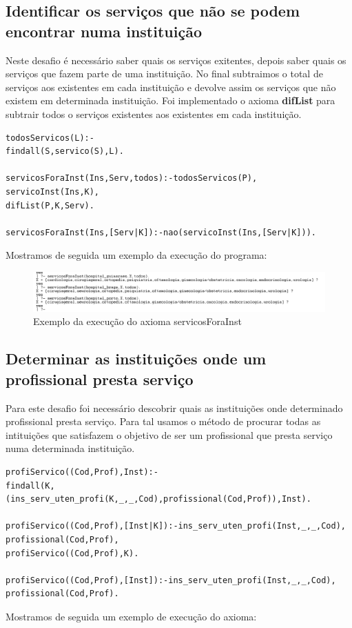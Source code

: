 \subsection{Identificar os serviços que não se podem encontrar numa instituição}
Neste desafio é necessário saber quais os serviços exitentes, depois saber quais os serviços que fazem parte de uma instituição. No final subtraimos o total de serviços aos existentes em cada instituição e devolve assim os serviços que não existem em determinada instituição. Foi implementado o axioma \textbf{difList} para subtrair todos o serviços existentes aos existentes em cada instituição. 

\begin{verbatim}
todosServicos(L):-
findall(S,servico(S),L).

servicosForaInst(Ins,Serv,todos):-todosServicos(P), 
servicoInst(Ins,K),
difList(P,K,Serv).

servicosForaInst(Ins,[Serv|K]):-nao(servicoInst(Ins,[Serv|K])).
\end{verbatim}

Mostramos de seguida um exemplo da execução do programa: 

\begin{figure}[<+htpb+>]
	\centering
	\includegraphics[scale=0.6]{answer6.png}
	\caption{Exemplo da execução do axioma servicosForaInst}
	\label{p3:fig:output6}
\end{figure}

\subsection{Determinar as instituições onde um profissional presta serviço }
Para este desafio foi necessário descobrir quais as instituições onde determinado profissional presta serviço. Para tal usamos o método de procurar todas as intituições que satisfazem o objetivo de ser um profissional que presta serviço numa determinada instituição. 
\begin{verbatim}
profiServico((Cod,Prof),Inst):- 
findall(K,(ins_serv_uten_profi(K,_,_,Cod),profissional(Cod,Prof)),Inst).

profiServico((Cod,Prof),[Inst|K]):-ins_serv_uten_profi(Inst,_,_,Cod),
profissional(Cod,Prof),
profiServico((Cod,Prof),K).

profiServico((Cod,Prof),[Inst]):-ins_serv_uten_profi(Inst,_,_,Cod),
profissional(Cod,Prof).
\end{verbatim}
Mostramos de seguida um exemplo de execução do axioma: 

